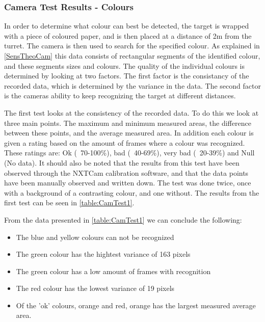 
\subsubsection{Camera Test Results - Colours}\label{CamTestColours}
In order to determine what colour can best be detected, the target is wrapped
with a piece of coloured paper, and is then placed at a distance of 2m from the
turret. The camera is then used to search for the specified colour. As explained
in \autoref{SensTheoCam} this data consists of rectangular segments of the
identified colour, and these segments sizes and colours. The quality of the
individual colours is determined by looking at two factors. The first factor is
the consistancy of the recorded data, which is determined by the variance in the
data. The second factor is the cameras ability to keep recognizing the target
at different distances.\nl

The first test looks at the consistency of the recorded data. To do this we look
at three main points. The maximum and minimum measured areas, the difference
between these points, and the average measured area. In addition each colour is
given a rating based on the amount of frames where a colour was recognized.
These ratings are: Ok (~70-100\%), bad (~40-69\%), very bad (~20-39\%) and Null
(No data). It should also be noted that the results from this test have been
observed through the NXTCam calibration software, and that the data points have
been manually observed and written down. The test was done twice, once with a
background of a contrasting colour, and one without. The results from the first
test can be seen in \autoref{table:CamTest1}.


From the data presented in \autoref{table:CamTest1} we can conclude the
following:
\begin{itemize}
  \item The blue and yellow colours can not be recognized
  \item The green colour has the hightest variance of 163 pixels
  \item The green colour has a low amount of frames with recognition
  \item The red colour has the lowest variance of 19 pixels
  \item Of the 'ok' colours, orange and red, orange has the largest measured
  average area.
\end{itemize}

